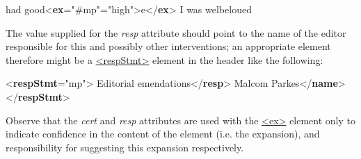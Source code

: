 \begin{shaded}
 had good{<\textbf{ex}\hspace*{1em}{resp}="{\#mp}"\hspace*{1em}{cert}="{high}">}e{</\textbf{ex}>} I was welbeloued\end{shaded}\egroup\par \noindent  The value supplied for the {\itshape resp} attribute should point to the name of the editor responsible for this and possibly other interventions; an appropriate element therefore might be a \hyperref[TEI.respStmt]{<respStmt>} element in the header like the following: \par\bgroup{}\exampleFont \begin{shaded}\noindent\mbox{}{<\textbf{respStmt}\hspace*{1em}{xml:id}="{mp}">}\mbox{}\newline 
{}Editorial emendations{</\textbf{resp}>}\mbox{}\newline 
{}Malcom Parkes{</\textbf{name}>}\mbox{}\newline 
{</\textbf{respStmt}>}\end{shaded}\egroup\par \noindent  Observe that the {\itshape cert} and {\itshape resp} attributes are used with the \hyperref[TEI.ex]{<ex>} element only to indicate confidence in the content of the element (i.e. the expansion), and responsibility for suggesting this expansion respectively.\par
